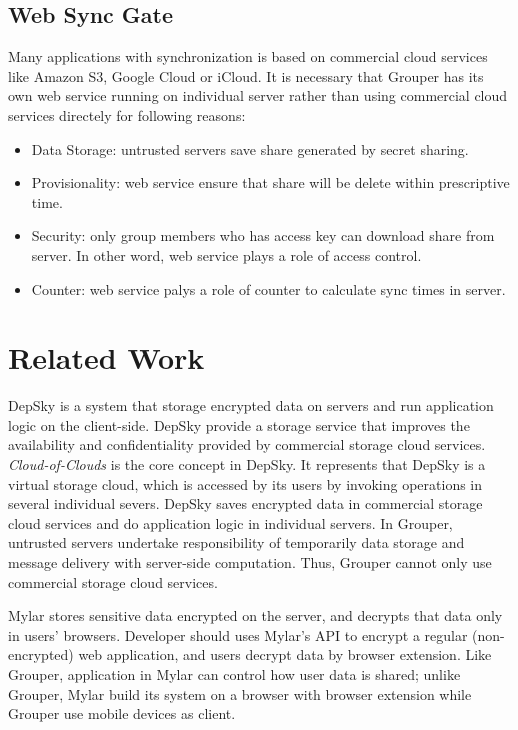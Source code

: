 \documentclass[twocolumn,10pt]{article}
\begin{document}
\subsection{Web Sync Gate}
Many applications with synchronization is based on commercial cloud services like Amazon S3, Google Cloud or iCloud. It is necessary that Grouper has its own web service running on individual server rather than using commercial cloud services directely for following reasons:

\begin{itemize}
\setlength{\itemsep}{1pt}
\setlength{\parskip}{0pt}
\setlength{\parsep}{0pt}
    \item Data Storage: untrusted servers save share generated by secret sharing.
    \item Provisionality: web service ensure that share will be delete within prescriptive time.
    \item Security: only group members who has access key can download share from server. In other word, web service plays a role of access control.
    \item Counter: web service palys a role of counter to calculate sync times in server.
\end{itemize}

\section{Related Work}

DepSky\cite{bessani2013depsky} is a system that storage encrypted data on servers and run application logic on the client-side\cite{wang2016sieve}. DepSky provide a storage service that improves the availability and confidentiality provided by commercial storage cloud services. \emph{Cloud-of-Clouds} is the core concept in DepSky. It represents that DepSky is a virtual storage cloud, which is accessed by its users by invoking operations in several individual severs. DepSky saves encrypted data in commercial storage cloud services and do application logic in individual servers. In Grouper,  untrusted servers undertake responsibility of temporarily data storage and message delivery with server-side computation. Thus, Grouper cannot only use commercial storage cloud services.

Mylar\cite{popa2014building} stores sensitive data encrypted on the server, and decrypts that data only in users’ browsers. Developer should uses Mylar’s API to encrypt a regular (non-encrypted) web application, and users decrypt data by browser extension. Like Grouper, application in Mylar can control how user data is shared\cite{wang2016sieve}; unlike Grouper, Mylar build its system on a browser with browser extension while Grouper use mobile devices as client.
\end{document}
